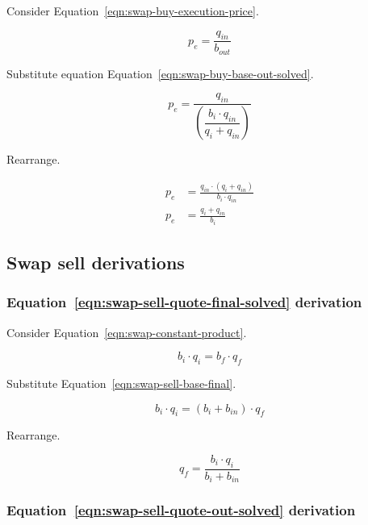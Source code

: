 \documentclass[table, twocolumn]{article}
\begin{document}
Consider Equation~\ref{eqn:swap-buy-execution-price}.

\begin{equation}
	p_e = \frac{q_{in}}{b_{out}} \nonumber
\end{equation}

Substitute equation Equation~\ref{eqn:swap-buy-base-out-solved}.

\begin{equation}
	p_e = \frac{q_{in}}{\left(\dfrac{b_i \cdot q_{in}}{q_i + q_{in}}\right)} \nonumber
\end{equation}

Rearrange.

\begin{align}
	p_e & = \frac{q_{in} \cdot (q_i + q_{in})}{b_i \cdot q_{in}} \nonumber \\
	p_e & = \frac{q_i + q_{in}}{b_i} \nonumber
\end{align}

\subsection{Swap sell derivations}\label{ssec:swap-sell-derivations}

\subsubsection{Equation~\ref{eqn:swap-sell-quote-final-solved} derivation}%
\label{sssec:equation-eqn-swap-sell-quote-final-solved-derivation}

Consider Equation~\ref{eqn:swap-constant-product}.

\begin{equation}
	b_i \cdot q_i = b_f \cdot q_f \nonumber
\end{equation}

Substitute Equation~\ref{eqn:swap-sell-base-final}.

\begin{equation}
	b_i \cdot q_i = (b_i + b_{in}) \cdot q_f \nonumber
\end{equation}

Rearrange.

\begin{equation}
	q_f = \frac{b_i \cdot q_i}{b_i + b_{in}} \nonumber
\end{equation}

\subsubsection{Equation~\ref{eqn:swap-sell-quote-out-solved} derivation}%
\label{sssec:equation-eqn-swap-sell-quote-out-solved-derivation}
\end{document}
